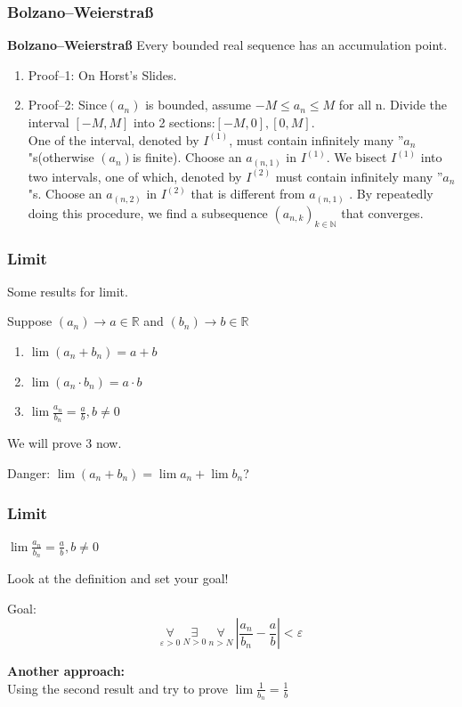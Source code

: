 \documentclass{beamer}
\begin{document}
\begin{frame}
    \frametitle{Bolzano--Weierstraß}
\textbf{Bolzano--Weierstraß} Every bounded real sequence has an accumulation point.
\begin{enumerate}
    \item Proof--1: On Horst's Slides.
    \item Proof--2:
        Since$(a_n)$ is bounded, assume $-M\leq a_n\leq M$ for all n. Divide the interval $[-M,M]$ into 2 sections:$[-M,0],[0,M]$.\\
        One of the interval, denoted by $I^{(1)}$, must contain infinitely many ''$a_n$"s(otherwise $(a_n)$is finite). Choose an $a_{(n,1)}$ 
        in $I^{(1)}$. We bisect $I^{(1)}$ into two intervals, one of which, denoted by $I^{(2)}$ must contain 
        infinitely many ''$a_n$ "s. Choose an $a_{(n,2)}$ in $I^{(2)}$ that is different from $a_{(n,1)}$ . By 
        repeatedly doing this procedure, we find a subsequence $(a_{n,k})_{k\in\mathbb{N}}$ that converges.
\end{enumerate}
\end{frame}
\begin{frame}
    \frametitle{Limit}
Some  results for limit.\\
\begin{center}
    Suppose $(a_n)\rightarrow a \in \mathbb{R}$ and $(b_n)\rightarrow b \in \mathbb{R}$  
\end{center}
\begin{enumerate}
    \item $\lim (a_n+b_n)=a+b$
    \item $\lim (a_n\cdot b_n) =a\cdot b$
    \item $\lim \frac{a_n}{b_n}=\frac{a}{b}, b\neq 0$
\end{enumerate}
We will prove 3 now.
\begin{block}{Danger:}
    \hspace{1em}
    $\lim (a_n+b_n)=\lim a_n + \lim b_n$?
\end{block}
\end{frame}
\begin{frame}
    \frametitle{Limit}
    \begin{center}
        $\lim \frac{a_n}{b_n}=\frac{a}{b}, b\neq 0$
    \end{center}
    Look at the definition and set your goal!
    \begin{block}{Goal:}
        \hspace{10em}
        $$\underset{\varepsilon>0}{\forall}~ \underset{N>0}{\exists} ~\underset{n>N}{\forall}~ |\frac{a_n}{b_n}-\frac{a}{b}|<\varepsilon$$
    \end{block}
    \textbf{Another approach:}\\
    \hspace{1em} Using the second result and try to prove $\lim \frac{1}{b_n}=\frac{1}{b}$
\end{frame}
\end{document}
